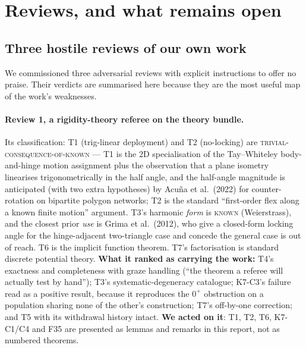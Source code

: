 \documentclass[11pt,a4paper]{article}
\theoremstyle{definition}
\begin{document}
\section{Reviews, and what remains open}
\label{sec:open}

\subsection{Three hostile reviews of our own work}

We commissioned three adversarial reviews with explicit instructions to offer no praise. Their
verdicts are summarised here because they are the most useful map of the work's weaknesses.

\paragraph{Review 1, a rigidity-theory referee on the theory bundle.} Its classification:
T1 (trig-linear deployment) and T2 (no-locking) are \textsc{trivial-consequence-of-known} ---
T1 is the 2D specialisation of the Tay--Whiteley body-and-hinge motion assignment plus the
observation that a plane isometry linearises trigonometrically in the half angle, and the
half-angle magnitude is anticipated (with two extra hypotheses) by Acu\~na et al.\ (2022) for
counter-rotation on bipartite polygon networks; T2 is the standard ``first-order flex along a
known finite motion'' argument. T3's harmonic \emph{form} is \textsc{known} (Weierstrass), and
the closest prior \emph{use} is Grima et al.\ (2012), who give a closed-form locking angle for
the hinge-adjacent two-triangle case and concede the general case is out of reach. T6 is the
implicit function theorem. T7's factorisation is standard discrete potential theory.
\textbf{What it ranked as carrying the work:} T4's exactness and completeness with graze
handling (``the theorem a referee will actually test by hand''); T3's systematic-degeneracy
catalogue; K7-C3's failure read as a positive result, because it reproduces the $0^+$
obstruction on a population sharing none of the other's construction; T7's off-by-one
correction; and T5 with its withdrawal history intact. \textbf{We acted on it}: T1, T2, T6,
K7-C1/C4 and F35 are presented as lemmas and remarks in this report, not as numbered theorems.
\end{document}
